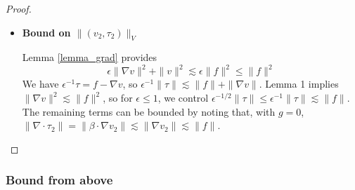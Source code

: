 \documentclass[11pt,onecolumn]{scrartcl}
\newcommand{\grad}{\nabla}
\renewcommand{\div}{\grad \cdot}
\begin{document}
\begin{proof}
\begin{itemize}
\item \textbf{Bound on $\|\left(v_{2},\tau_{2}\right)\|_V$}

Lemma \ref{lemma_grad} provides
\[
\epsilon \|\grad v\|^2 + \|v\|^2 \lesssim  \epsilon \| f\|^2 \leq \|f\|^2
\]
We have $\epsilon^{-1}\tau = f - \grad v$, so $\epsilon^{-1} \|\tau\| \lesssim \|f\| + \|\grad v\|$. Lemma 1 implies $\|\grad v\|^2  \lesssim  \| f\|^2$, so for $\epsilon \leq 1$, we control $\epsilon^{-1/2}\|\tau\| \leq \epsilon^{-1}\|\tau\| \lesssim \|f\|$.  The remaining terms can be bounded by noting that, with $g = 0$, $\|\div \tau_2\| = \|\beta\cdot \grad v_2\| \lesssim \|\grad v_2\| \lesssim \|f\| $.
\end{itemize}
\end{proof}

\subsubsection{Bound from above}
\end{document}
